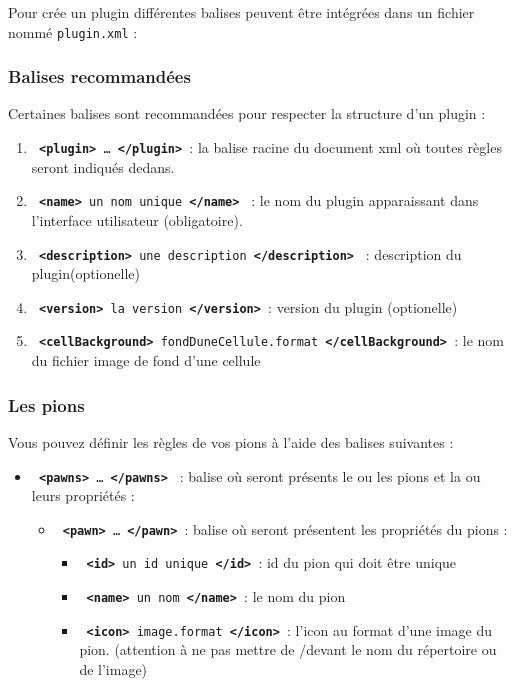 \documentclass[pdftex,12pt,a4paper]{article}
\newcommand{\commande}[1]{\texttt{#1}}
\newcommand{\balise}[2]{\texttt{%
\textbf{\textless#1\textgreater}%
#2%
\textbf{\textless/#1\textgreater}%
}}
\begin{document}
     Pour crée un plugin différentes balises peuvent être intégrées dans un fichier nommé \commande{plugin.xml} :
     	
        \subsubsection{Balises recommandées}
        
        Certaines balises sont recommandées pour respecter la structure d'un plugin :
        \begin{enumerate}
        	\item \balise{plugin}{\dots}: la balise racine du document xml où toutes règles seront indiqués dedans.
        	\item \balise{name}{un nom unique} : le nom du plugin apparaissant dans l'interface utilisateur (obligatoire).         
            \item \balise{description}{une description} : description du plugin(optionelle)
            \item \balise{version}{la version}: version du plugin (optionelle)
         	\item \balise{cellBackground}{fondDuneCellule.format}: le nom du fichier image de fond d'une cellule
        \end{enumerate}
        

         \subsubsection{Les pions}
         	Vous pouvez définir les règles de vos pions à l'aide des balises suivantes : 
 
            	\begin{itemize}
                  \item \balise{pawns}{\dots} : balise où seront présents le ou les pions et la ou leurs propriétés :
                	\begin{itemize}
                		\item \balise{pawn}{\dots}: balise où seront présentent les propriétés du pions : 			  
                        \begin{itemize}
                        \item \balise{id}{un id unique}: id du pion qui doit être unique
               			\item \balise{name}{un nom}: le nom du pion
                		\item \balise{icon}{image.format}: l'icon au format d'une image du pion. (attention à ne pas mettre de \slash devant le nom du répertoire ou de l'image)
  		       		  \end{itemize}	
                    \end{itemize} 
               \end{itemize}
               
\end{document}

